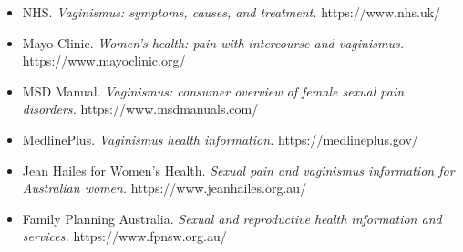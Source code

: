 \begin{itemize}
    \item NHS. \textit{Vaginismus: symptoms, causes, and treatment.} https://www.nhs.uk/
    \item Mayo Clinic. \textit{Women's health: pain with intercourse and vaginismus.} https://www.mayoclinic.org/
    \item MSD Manual. \textit{Vaginismus: consumer overview of female sexual pain disorders.} https://www.msdmanuals.com/
    \item MedlinePlus. \textit{Vaginismus health information.} https://medlineplus.gov/
    \item Jean Hailes for Women's Health. \textit{Sexual pain and vaginismus information for Australian women.} https://www.jeanhailes.org.au/
    \item Family Planning Australia. \textit{Sexual and reproductive health information and services.} https://www.fpnsw.org.au/
\end{itemize}
